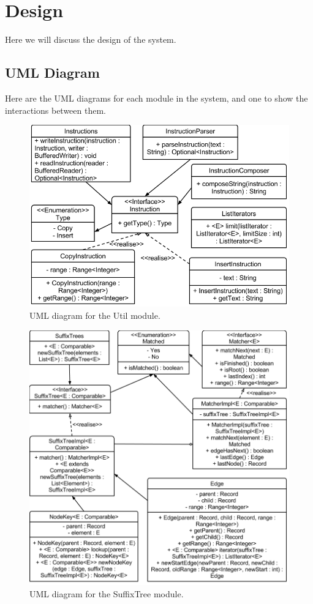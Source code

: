 \section{Design}

Here we will discuss the design of the system.

\subsection{UML Diagram}

Here are the UML diagrams for each module in the system, and one to show the interactions between them.

\begin{figure}[H]
\begin{center}
\includegraphics[width=\textwidth]{design/diffrUML-util.png}
\end{center}
\caption{UML diagram for the Util module.}
\label{fig:utilUML}
\end{figure}

\begin{figure}[H]
\begin{center}
\includegraphics[width=\textwidth]{design/diffrUML-suffixtree.png}
\end{center}
\caption{UML diagram for the SuffixTree module.}
\label{fig:suffixTreeUML}
\end{figure}



